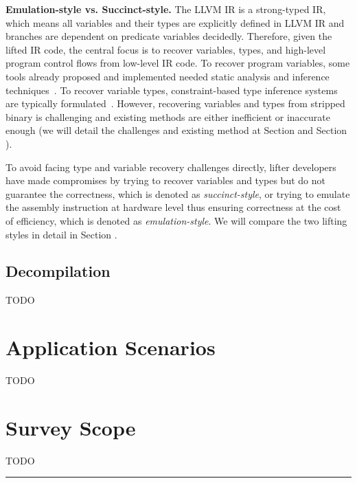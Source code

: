 \noindent \textbf{Emulation-style vs. Succinct-style.} The LLVM IR is a strong-typed IR, which means all variables and their types are explicitly defined in LLVM IR and branches are dependent on predicate variables decidedly. Therefore, given the lifted IR code, the central focus is to recover variables, types, and high-level program control flows from low-level IR code. To recover program variables, some tools already proposed and implemented needed static analysis and inference techniques~\cite{anand2013compiler,balakrishnan2010wysinwyx,balakrishnan2007divine,reps2008improved,elwazeer2013scalable}. To recover variable types, constraint-based type inference systems are typically formulated~\cite{lee2011tie,noonan2016polymorphic}. However, recovering variables and types from stripped binary is challenging and existing methods are either inefficient or inaccurate enough (we will detail the challenges and existing method at Section  and Section ).

To avoid facing type and variable recovery challenges directly, lifter developers have made compromises by trying to recover variables and types but do not guarantee the correctness, which is denoted as \textit{succinct-style}, or trying to emulate the assembly instruction at hardware level thus ensuring correctness at the cost of efficiency, which is denoted as \textit{emulation-style}. We will compare the two lifting styles in detail in Section .

\subsection{Decompilation} \label{sec:background-decompilation}

TODO

\section{Application Scenarios} \label{sec:background-applications}
TODO

\section{Survey Scope} \label{sec:background-scope}
TODO

\noindent\rule{8cm}{0.4pt}

\newpage
